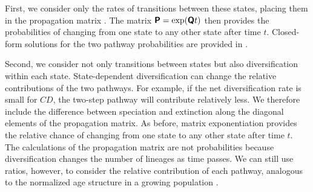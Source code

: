 First, we consider only the rates of transitions between these states, placing them in the propagation matrix .
The matrix $\bm{\mathsf{P}} = \exp(\bm{\mathsf{Q}} t)$ then provides the probabilities of changing from one state to any other state after time $t$.
Closed-form solutions for the two pathway probabilities are provided in \citet{robertson_2011}.


Second, we consider not only transitions between states but also diversification within each state.
State-dependent diversification can change the relative contributions of the two pathways.
For example, if the net diversification rate is small for $CD$, the two-step pathway will contribute relatively less.
We therefore include the difference between speciation and extinction along the diagonal elements of the propagation matrix.
As before, matrix exponentiation provides the relative chance of changing from one state to any other state after time $t$.
The calculations of the propagation matrix are not probabilities because diversification changes the number of lineages as time passes. 
We can still use ratios, however, to consider the relative contribution of each pathway, analogous to the normalized age structure in a growing population \citep{leslie_1945}.
%
%
%
